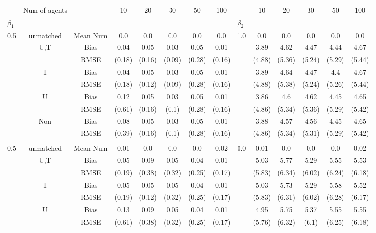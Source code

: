 \begin{tabular}{@{\extracolsep{5pt}}lc|cccccc|lccccc}
\toprule 
 & Num of agents &  & 10 & 20 & 30 & 50 & 100 &  & 10 & 20 & 30 & 50 & 100 \\
$\beta_1$ &  &  &  &  &  &  &  & $\beta_2$ &  &  &  &  &  \\
\midrule 
0.5 & unmatched & Mean Num & 0.0 & 0.0 & 0.0 & 0.0 & 0.0 & 1.0 & 0.0 & 0.0 & 0.0 & 0.0 & 0.0 \\
 & U,T & Bias & 0.04 & 0.05 & 0.03 & 0.05 & 0.01 &  & 3.89 & 4.62 & 4.47 & 4.44 & 4.67 \\
 &  & RMSE & (0.18) & (0.16) & (0.09) & (0.28) & (0.16) &  & (4.88) & (5.36) & (5.24) & (5.29) & (5.44) \\
 & T & Bias & 0.04 & 0.05 & 0.03 & 0.05 & 0.01 &  & 3.89 & 4.64 & 4.47 & 4.4 & 4.67 \\
 &  & RMSE & (0.18) & (0.12) & (0.09) & (0.28) & (0.16) &  & (4.88) & (5.38) & (5.24) & (5.26) & (5.44) \\
 & U & Bias & 0.12 & 0.05 & 0.03 & 0.05 & 0.01 &  & 3.86 & 4.6 & 4.62 & 4.45 & 4.65 \\
 &  & RMSE & (0.61) & (0.16) & (0.1) & (0.28) & (0.16) &  & (4.86) & (5.34) & (5.36) & (5.29) & (5.42) \\
 & Non & Bias & 0.08 & 0.05 & 0.03 & 0.05 & 0.01 &  & 3.88 & 4.57 & 4.56 & 4.45 & 4.65 \\
 &  & RMSE & (0.39) & (0.16) & (0.1) & (0.28) & (0.16) &  & (4.86) & (5.34) & (5.31) & (5.29) & (5.42) \\
 &  &  &  &  &  &  &  &  &  &  &  &  &  \\
0.5 & unmatched & Mean Num & 0.01 & 0.0 & 0.0 & 0.0 & 0.02 & 0.0 & 0.01 & 0.0 & 0.0 & 0.0 & 0.02 \\
 & U,T & Bias & 0.05 & 0.09 & 0.05 & 0.04 & 0.01 &  & 5.03 & 5.77 & 5.29 & 5.55 & 5.53 \\
 &  & RMSE & (0.19) & (0.38) & (0.32) & (0.25) & (0.17) &  & (5.83) & (6.34) & (6.02) & (6.24) & (6.18) \\
 & T & Bias & 0.05 & 0.05 & 0.05 & 0.04 & 0.01 &  & 5.03 & 5.73 & 5.29 & 5.58 & 5.52 \\
 &  & RMSE & (0.19) & (0.12) & (0.32) & (0.25) & (0.17) &  & (5.83) & (6.31) & (6.02) & (6.28) & (6.17) \\
 & U & Bias & 0.13 & 0.09 & 0.05 & 0.04 & 0.01 &  & 4.95 & 5.75 & 5.37 & 5.55 & 5.55 \\
 &  & RMSE & (0.61) & (0.38) & (0.32) & (0.25) & (0.17) &  & (5.76) & (6.32) & (6.1) & (6.25) & (6.18) \\

\end{tabular}
